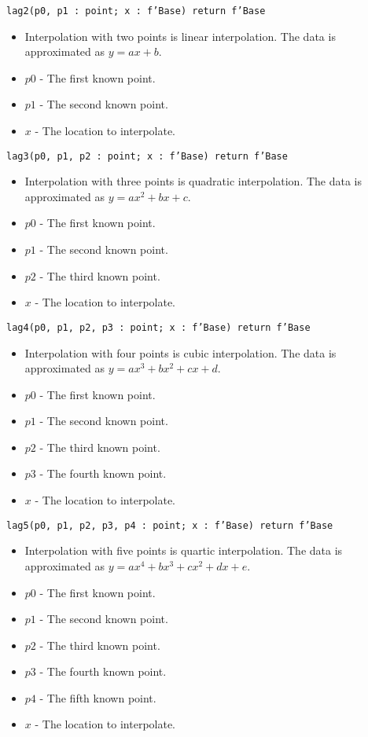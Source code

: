 \documentclass[10pt, openany]{book}
\newcommand{\function}[1]{\texttt{#1}}
\begin{document}
\function{lag2(p0, p1 : point; x : f'Base) return f'Base}
\begin{itemize}
  \item Interpolation with two points is linear interpolation.  The data is approximated as $y = ax+b$.
  \item $p0$ - The first known point.
  \item $p1$ - The second known point.
  \item $x$ - The location to interpolate.
\end{itemize}

\function{lag3(p0, p1, p2 : point; x : f'Base) return f'Base}
\begin{itemize}
  \item Interpolation with three points is quadratic interpolation.  The data is approximated as $y = ax^2+bx+c$.
  \item $p0$ - The first known point.
  \item $p1$ - The second known point.
  \item $p2$ - The third known point.
  \item $x$ - The location to interpolate.
\end{itemize}

\function{lag4(p0, p1, p2, p3 : point; x : f'Base) return f'Base}
\begin{itemize}
  \item Interpolation with four points is cubic interpolation.  The data is approximated as $y = ax^3+bx^2+cx+d$.
  \item $p0$ - The first known point.
  \item $p1$ - The second known point.
  \item $p2$ - The third known point.
  \item $p3$ - The fourth known point.
  \item $x$ - The location to interpolate.
\end{itemize}

\function{lag5(p0, p1, p2, p3, p4 : point; x : f'Base) return f'Base}
\begin{itemize}
  \item Interpolation with five points is quartic interpolation.  The data is approximated as $y = ax^4+bx^3+cx^2+dx+e$.
  \item $p0$ - The first known point.
  \item $p1$ - The second known point.
  \item $p2$ - The third known point.
  \item $p3$ - The fourth known point.
  \item $p4$ - The fifth known point.
  \item $x$ - The location to interpolate.
\end{itemize}
\end{document}
